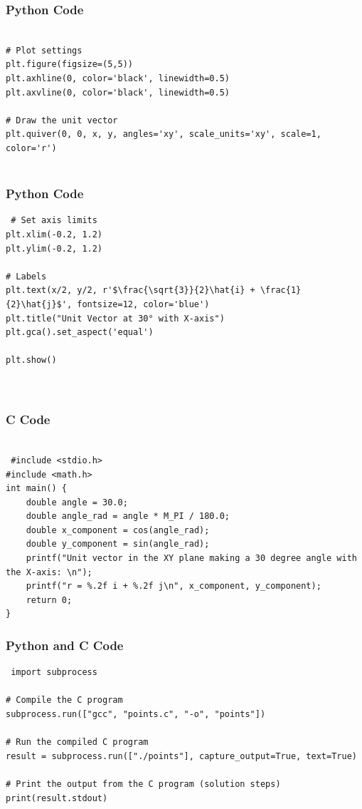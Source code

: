 \documentclass{beamer}
\begin{document}
\begin{frame}[fragile]
    \frametitle{Python Code}

    \begin{lstlisting}
    
# Plot settings
plt.figure(figsize=(5,5))
plt.axhline(0, color='black', linewidth=0.5)
plt.axvline(0, color='black', linewidth=0.5)

# Draw the unit vector
plt.quiver(0, 0, x, y, angles='xy', scale_units='xy', scale=1, color='r')
 

    \end{lstlisting}
\end{frame}

\begin{frame}[fragile]
    \frametitle{Python Code}

    \begin{lstlisting}
 # Set axis limits
plt.xlim(-0.2, 1.2)
plt.ylim(-0.2, 1.2)

# Labels
plt.text(x/2, y/2, r'$\frac{\sqrt{3}}{2}\hat{i} + \frac{1}{2}\hat{j}$', fontsize=12, color='blue')
plt.title("Unit Vector at 30° with X-axis")
plt.gca().set_aspect('equal')

plt.show()



    \end{lstlisting}
\end{frame}

 
\begin{frame}[fragile]
\frametitle{C Code}
\begin{lstlisting}
  
 #include <stdio.h>
#include <math.h>
int main() {
    double angle = 30.0;
    double angle_rad = angle * M_PI / 180.0;
    double x_component = cos(angle_rad);
    double y_component = sin(angle_rad);
    printf("Unit vector in the XY plane making a 30 degree angle with the X-axis: \n");
    printf("r = %.2f i + %.2f j\n", x_component, y_component);
    return 0;
}

\end{lstlisting}
\end{frame}

\begin{frame}[fragile]
\frametitle{Python and C Code}

\begin{lstlisting}
 import subprocess

# Compile the C program
subprocess.run(["gcc", "points.c", "-o", "points"])

# Run the compiled C program
result = subprocess.run(["./points"], capture_output=True, text=True)

# Print the output from the C program (solution steps)
print(result.stdout) 

\end{lstlisting}

\end{frame}
\end{document}

